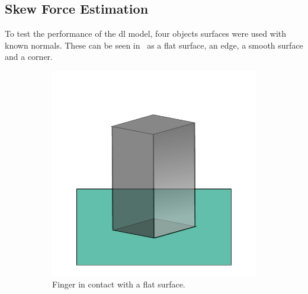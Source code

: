 \subsection{Skew Force Estimation}\label{sec:1-tactile-perception-experimental-setup-skew-force-estimation}

To test the performance of the \gls{dl} model, four objects surfaces were used with known normals. These can be seen in~ as a flat surface, an edge, a smooth surface and a corner.

\begin{figure}[!h]
	\centering
	\begin{subfigure}[b]{0.24\textwidth}
		\centering
		\includegraphics[width=\textwidth]{chapters/1-tactile-perception/fig/inkscape/flat-contact-3d.pdf}
		\caption{Finger in contact with a flat surface.}
		\label{fig:flat-contact}
	\end{subfigure}
	\hfill
	\begin{subfigure}[b]{0.24\textwidth}
		\centering

\end{subfigure}
\end{figure}
